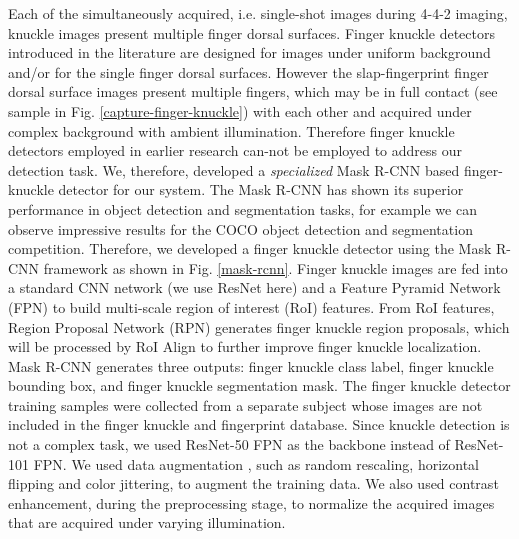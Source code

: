 Each of the simultaneously acquired, i.e. single-shot images during 4-4-2 imaging, knuckle images present multiple finger dorsal surfaces. Finger knuckle detectors introduced in the literature \cite{jaswal2016knuckle} are designed for images under uniform background and/or for the single finger dorsal surfaces. However the slap-fingerprint finger dorsal surface images present multiple fingers, which may be in full contact (see sample in Fig. \ref{capture-finger-knuckle}) with each other and acquired under complex background with ambient illumination. Therefore finger knuckle detectors employed in earlier research \cite{kumar2009personal} can-not be employed to address our detection task. We, therefore, developed a \textit{specialized} Mask R-CNN \cite{he2017mask} based finger-knuckle detector for our system. The Mask R-CNN \cite{he2017mask} has shown its superior performance in object detection and segmentation tasks, for example we can observe impressive results for the COCO \cite{lin2014microsoft} object detection and segmentation competition. Therefore, we developed a finger knuckle detector using the Mask R-CNN framework as shown in Fig. \ref{mask-rcnn}. Finger knuckle images are fed into a standard CNN network (we use ResNet \cite{he2016deep} here) and a Feature Pyramid Network (FPN) \cite{lin2017feature} to build multi-scale region of interest (RoI) features. From RoI features, Region Proposal Network (RPN) generates finger knuckle region proposals, which will be processed by RoI Align to further improve finger knuckle localization. Mask R-CNN generates three outputs: finger knuckle class label, finger knuckle bounding box, and finger knuckle segmentation mask. The finger knuckle detector training samples were collected from a separate subject whose images are not included in the finger knuckle and fingerprint database. Since knuckle detection is not a complex task, we used ResNet-50 FPN as the backbone instead of ResNet-101 FPN. We used data augmentation \cite{data-augmentation}, such as random rescaling, horizontal flipping and color jittering, to augment the training data. We also used contrast enhancement, during the preprocessing stage, to normalize the acquired images that are acquired under varying illumination.  

